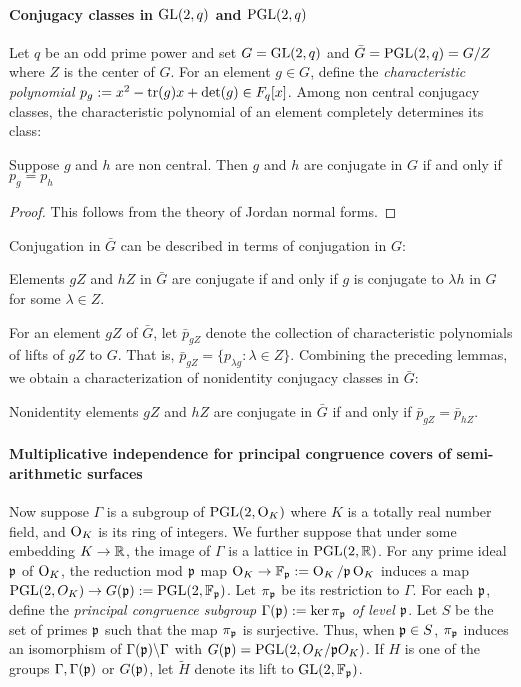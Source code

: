 \documentclass[11pt]{amsart}
\begin{document}
\paragraph{Conjugacy classes in $\operatorname{GL}(2,q)$ and $\operatorname{PGL}(2,q)$} 
Let $q$ be an odd prime power and set $G=\operatorname{GL}(2,q)$ and $\bar{G}=\operatorname{PGL}(2,q)=G/ Z$ where $Z$ is the center of $G$. For an element $g\in G$, define the \emph{characteristic polynomial} $p_{g}:=x^{2}-\operatorname{tr}(g)x+\det(g) \in F_{q}[x]$. Among non central conjugacy classes, the characteristic polynomial of an element completely determines its class:
	\begin{lemma}
		Suppose $g$ and $h$ are non central. Then $g$ and $h$ are conjugate in $G$ if and only if $p_{g}=p_{h}$ 
	\end{lemma} 
	\begin{proof}
		This follows from the theory of Jordan normal forms.
	\end{proof}
Conjugation in $\bar{G}$ can be described in terms of conjugation in $G$:
	\begin{lemma}
		Elements $gZ$ and $hZ$ in $\bar{G}$ are conjugate if and only if $g$ is conjugate to $\lambda h$ in $G$ for some $\lambda \in Z$. 
	\end{lemma}
For an element $gZ$ of $\bar{G}$, let $\bar{p}_{gZ}$ denote the collection of characteristic polynomials of lifts of $gZ$ to $G$. That is, $\bar{p}_{gZ}=\{p_{\lambda g}: \lambda \in Z\}$. Combining the preceding lemmas, we obtain a characterization of nonidentity conjugacy classes in $\bar{G}$:
	\begin{lemma}
		Nonidentity elements $gZ$ and $hZ$ are conjugate in $\bar{G}$ if and only if $\bar{p}_{gZ}=\bar{p}_{hZ}$. 
	\end{lemma}
\paragraph{Multiplicative independence for principal congruence covers of semi-arithmetic surfaces}
 
Now suppose $\Gamma$ is a subgroup of $\operatorname{PGL}(2,\operatorname{O}_K)$  where $K$ is a totally real number field, and $\operatorname{O}_K$ is its ring of integers. We further suppose that under some embedding $K\to \mathbb{R}$, the image of $\Gamma$ is a lattice in $\operatorname{PGL}(2,\mathbb{R})$.  For any prime ideal $\mathfrak{p}$ of $\operatorname{O}_K$, the reduction mod $\mathfrak{p}$ map $\operatorname{O}_K \to \mathbb{F}_{\mathfrak{p}}:=\operatorname{O}_K / \mathfrak{p} \operatorname{O}_K$ induces a map $\operatorname{PGL}(2,O_K)\to G(\mathfrak{p}):=\operatorname{PGL}(2,\mathbb{F}_{\mathfrak{p}})$. Let $\pi_{\mathfrak{p}}$ be its restriction to $\Gamma$. For each $\mathfrak{p}$, define the \emph{principal congruence subgroup}  $\Gamma(\mathfrak{p}) := \ker \pi_{\mathfrak{p}}$ \emph{of level $\mathfrak{p}$}. Let $S$ be the set of primes $\mathfrak{p}$ such that the map $\pi_{\mathfrak{p}}$ is surjective. Thus, when $\mathfrak{p} \in S$, $\pi_{\mathfrak{p}}$ induces an isomorphism of $\Gamma(\mathfrak{p}) \backslash \Gamma$ with $G(\mathfrak{p})=\operatorname{PGL}(2,O_K/ \mathfrak{p} O_K)$. If $H$ is one of the groups $\Gamma,\Gamma(\mathfrak{p})$ or $G(\mathfrak{p})$, let $\tilde{H}$ denote its lift to $\operatorname{GL}(2,\mathbb{F}_{\mathfrak{p}})$.
\end{document}

